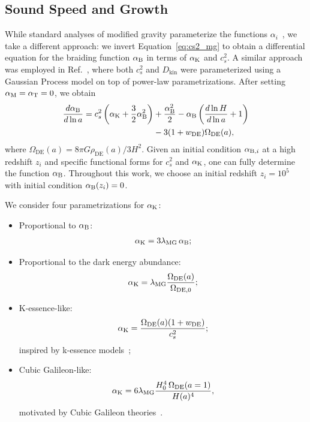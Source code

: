 \documentclass[%
reprint,
superscriptaddress,
preprint numbers,
nofootinbib,
amsmath,amssymb,
aps,
prd
]{revtex4-2}
\begin{document}
\subsection{Sound Speed and Growth}

While standard analyses of modified gravity parameterize the functions $\alpha_i$~\cite{scalar_tensor_future}, we take a different approach: we invert Equation~\ref{eq:cs2_mg} to obtain a differential equation for the braiding function $\alpha_{\rm B}$ in terms of $\alpha_{\rm K}$ and $c_s^2$. A similar approach was employed in Ref.~\cite{kazuya_mg_phantom}, where both $c_s^2$ and $D_\mathrm{kin}$ were parameterized using a Gaussian Process model on top of power-law parametrizations. After setting $\alpha_{\rm M} = \alpha_{\rm T} = 0$, we obtain
\begin{align}\label{eq:braiding_ode}
    \frac{d\alpha_{\rm B}}{d\ln a} = c_s^2\left(\alpha_{\rm K} + \frac{3}{2}\alpha_{\rm B}^2\right)& + \frac{\alpha_{\rm B}^2}{2} - \alpha_{\rm B}\left(\frac{d\ln H}{d \ln a} + 1\right)\nonumber\\
    &- 3(1+w_\mathrm{DE})\Omega_\mathrm{DE}(a),
\end{align}
where $\Omega_\mathrm{DE}(a) = 8\pi G \rho_\mathrm{DE}(a)/3H^2$. Given an initial condition $\alpha_{{\rm B},i}$ at a high redshift $z_i$ and specific functional forms for $c_s^2$ and $\alpha_{\rm K}$, one can fully determine the function $\alpha_{\rm B}$. Throughout this work, we choose an initial redshift $z_i = 10^5$ with initial condition $\alpha_{\rm B}(z_i) = 0$.

We consider four parametrizations for $\alpha_{\rm K}$:
\begin{itemize}
    \item Proportional to $\alpha_{\rm B}$:
    \begin{align}
        \alpha_{\rm K} = 3\lambda_{\rm MG}\,\alpha_{\rm B};
    \end{align}

    \item Proportional to the dark energy abundance:
    \begin{align}
        \alpha_{\rm K} =
        \lambda_{\rm MG}
        \frac{\Omega_{\rm DE}(a)}{\Omega_{\rm DE,0}};
    \end{align}

    \item K-essence-like:
    \begin{align}
        \alpha_{\rm K} =
        \frac{\Omega_{\rm DE}(a)(1+w_{\rm DE})}{c_s^2};
    \end{align}
    inspired by k-essence models~\cite{bellini_sawicky};

    \item Cubic Galileon-like:
    \begin{align}
        \alpha_{\rm K} =
        6\lambda_{\rm MG}
        \frac{H_0^4\,\Omega_{\rm DE}(a=1)}{H(a)^4},
    \end{align}
    motivated by Cubic Galileon theories~\cite{galileon, galileon_planck, mochi_class}.
\end{itemize}
\end{document}
